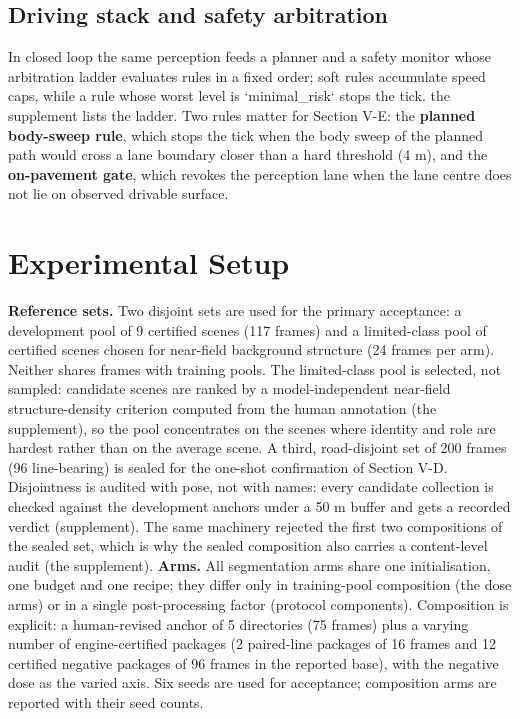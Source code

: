 \documentclass[journal]{IEEEtran}
\begin{document}
\subsection{Driving stack and safety arbitration}
In closed loop the same perception feeds a planner and a safety monitor whose arbitration ladder
evaluates rules in a fixed order; soft rules accumulate speed caps, while a rule whose worst level is
`minimal_risk` stops the tick. the supplement lists the ladder. Two rules matter for Section V-E: the
\textbf{planned body-sweep rule}, which stops the tick when the body sweep of the planned path would cross
a lane boundary closer than a hard threshold (4 m), and the \textbf{on-pavement gate}, which revokes the
perception lane when the lane centre does not lie on observed drivable surface.
\section{Experimental Setup}
\textbf{Reference sets.} Two disjoint sets are used for the primary acceptance: a development pool of 9
certified scenes (117 frames) and a limited-class pool of certified scenes chosen for near-field
background structure (24 frames per arm). Neither shares frames with training pools.
The limited-class pool is selected, not sampled: candidate scenes are ranked by a model-independent near-field structure-density criterion computed from the human annotation (the supplement), so the pool concentrates on the scenes where identity and role are hardest rather than on the average scene. A third,
road-disjoint set of 200 frames (96 line-bearing) is sealed for the one-shot confirmation of
Section V-D.
Disjointness is audited with pose, not with names: every candidate collection is checked against the development anchors under a 50 m buffer and gets a recorded verdict (supplement). The same machinery rejected the first two compositions of the sealed set, which is why the sealed composition also carries a content-level audit (the supplement).
\textbf{Arms.} All segmentation arms share one initialisation, one budget and one recipe; they differ only in training-pool
composition (the dose arms) or in a single post-processing factor (protocol components). Composition is explicit: a
human-revised anchor of 5 directories (75 frames) plus a varying number of engine-certified packages (2 paired-line
packages of 16 frames and 12 certified negative packages of 96 frames in the reported base), with the negative dose as the
varied axis. Six seeds are used for acceptance; composition arms are reported with their seed counts.
\end{document}

